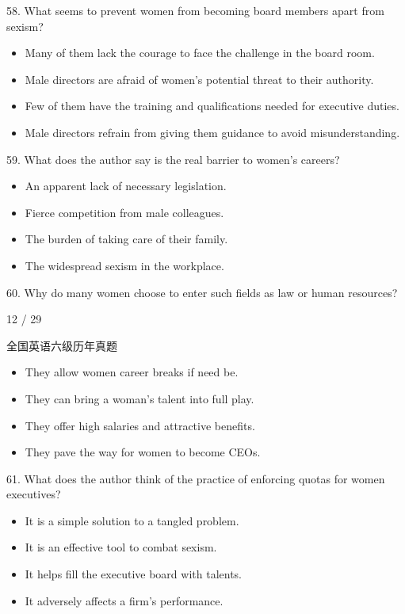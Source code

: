 \documentclass[UTF8,11pt]{ctexart}
\begin{document}
58. What seems to prevent women from becoming board members apart from sexism?


\begin{itemize}[leftmargin=2em,itemsep=.2em,topsep=.4em]\item[A.] Many of them lack the courage to face the challenge in the board room.
\item[B.] Male directors are afraid of women's potential threat to their authority.
\item[C.] Few of them have the training and qualifications needed for executive duties.
\item[D.] Male directors refrain from giving them guidance to avoid misunderstanding.
\end{itemize}

59. What does the author say is the real barrier to women's careers?


\begin{itemize}[leftmargin=2em,itemsep=.2em,topsep=.4em]\item[A.] An apparent lack of necessary legislation.
\item[B.] Fierce competition from male colleagues.
\item[C.] The burden of taking care of their family.
\item[D.] The widespread sexism in the workplace.
\end{itemize}

60. Why do many women choose to enter such fields as law or human resources?


12 / 29


全国英语六级历年真题


\begin{itemize}[leftmargin=2em,itemsep=.2em,topsep=.4em]\item[A.] They allow women career breaks if need be.
\item[B.] They can bring a woman's talent into full play.
\item[C.] They offer high salaries and attractive benefits.
\item[D.] They pave the way for women to become CEOs.
\end{itemize}

61. What does the author think of the practice of enforcing quotas for women executives?


\begin{itemize}[leftmargin=2em,itemsep=.2em,topsep=.4em]\item[A.] It is a simple solution to a tangled problem.
\item[B.] It is an effective tool to combat sexism.
\item[C.] It helps fill the executive board with talents.
\item[D.] It adversely affects a firm's performance.
\end{itemize}
\end{document}
